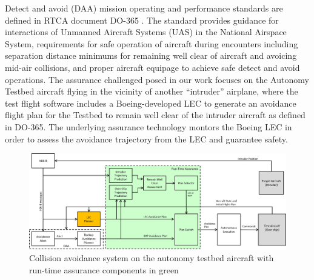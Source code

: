 Detect and avoid (DAA) mission operating and performance standards are defined in RTCA document DO-365 \cite{DO_365}.  The standard provides guidance for interactions of Unmanned Aircraft Systems (UAS) in the National Airspace System, requirements for safe operation of aircraft during encounters including separation distance minimums for remaining well clear of aircraft and avoicing mid-air collisions, and proper aircraft equipage to achieve safe detect and avoid operations.
The assurance challenged posed in our work focuses on the Autonomy Testbed aircraft flying in the vicinity of another ``intruder'' airplane, where the test flight software includes a Boeing-developed LEC to generate an avoidance flight plan for the Testbed to remain well clear of the intruder aircraft as defined in DO-365.  The underlying assurance technology montors the Boeing LEC in order to assess the avoidance trajectory from the LEC and guarantee safety. 

\begin{figure}
	\centering
	\includegraphics[width=\textwidth]{figures/rta-arch.jpg}
	\caption{Collision avoidance system on the autonomy testbed aircraft with run-time assurance components in green}
	\label{fig:rta-arch}
\end{figure}

